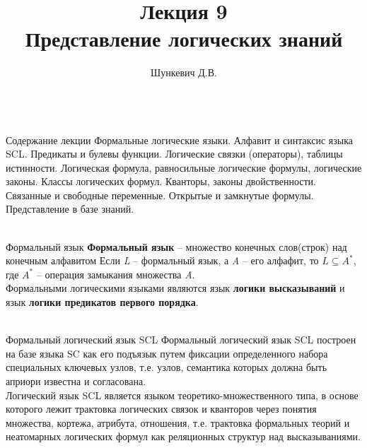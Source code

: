 \title{Лекция 9\\Представление логических знаний}
\author[]{Шункевич Д.В.}

\begin{frame}
	\titlepage
\end{frame}

\begin{frame}{\\Содержание лекции}
	\topline
	\justifying
	Формальные логические языки. Алфавит и синтаксис языка SCL. Предикаты и булевы функции. Логические связки (операторы), таблицы истинности. Логическая формула, равносильные логические формулы, логические законы. Классы логических формул. Кванторы, законы двойственности. Связанные и свободные переменные. Открытые и замкнутые формулы. Представление в базе знаний.
\end{frame}

\begin{frame}{\\Формальный язык}
	\topline
	\textbf{Формальный язык} -- множество конечных слов(строк) над конечным алфавитом
	Если \textit{L} -- формальный язык, а \textit{A} -- его алфафит, то $L \subseteq A^*$, где $A^*$ -- операция замыкания множества \textit{A}.\\
	Формальными логическими языками являются язык \textbf{логики высказываний} и язык \textbf{логики предикатов первого порядка}.	
\end{frame}

\begin{frame}{\\Формальный логический язык SCL}
	\topline
	\justifying
	Формальный логический язык SCL построен на базе языка SC как его подъязык путем фиксации определенного набора специальных ключевых узлов, т.е. узлов, семантика которых должна быть априори
	известна и согласована.\\
	Логический язык SCL является языком теоретико-множественного типа, в основе которого лежит трактовка логических связок и кванторов через понятия множества, кортежа, атрибута, отношения, т.е.
	трактовка формальных теорий и неатомарных логических формул как реляционных структур над высказываниями. 
\end{frame}


